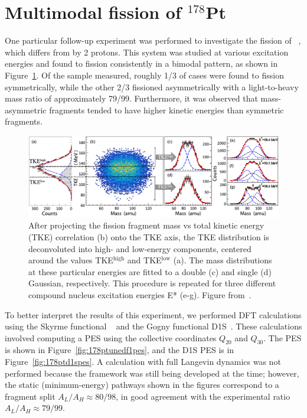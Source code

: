 \section{Multimodal fission of $^{178}$Pt}\label{sect:178Ptfrags}

One particular follow-up experiment was performed to investigate the fission of {\Pt}~\cite{Tsekhanovich2019}, which differs from {\Hg} by 2 protons. This system was studied at various excitation energies and found to fission consistently in a bimodal pattern, as shown in Figure~\ref{fig:178ptexptdata}. Of the sample measured, roughly 1/3 of cases were found to fission symmetrically, while the other 2/3 fissioned asymmetrically with a light-to-heavy mass ratio of approximately 79/99. Furthermore, it was observed that mass-asymmetric fragments tended to have higher kinetic energies than symmetric fragments.

\begin{figure}
	\centering
	\includegraphics[width=0.95\linewidth]{TeX_files/178Pt_expt_data}
	\caption[After projecting the fission fragment mass vs total kinetic energy (TKE) correlation (b) onto the TKE axis, the TKE distribution is deconvoluted into high- and low-energy components, centered around the values TKE$^\mathrm{high}$ and TKE$^\mathrm{low}$ (a). The mass distributions at these particular energies are fitted to a double (c) and single (d) Gaussian, respectively. This procedure is repeated for three different compound nucleus excitation energies E* (e-g).]{After projecting the fission fragment mass vs total kinetic energy (TKE) correlation (b) onto the TKE axis, the TKE distribution is deconvoluted into high- and low-energy components, centered around the values TKE$^\mathrm{high}$ and TKE$^\mathrm{low}$ (a). The mass distributions at these particular energies are fitted to a double (c) and single (d) Gaussian, respectively. This procedure is repeated for three different compound nucleus excitation energies E* (e-g). Figure from~\cite{Tsekhanovich2019}.}
	\label{fig:178ptexptdata}
\end{figure}

To better interpret the results of this experiment, we performed DFT calculations using the Skyrme functional {\hfb}~\cite{Schunck2015} and the Gogny functional D1S~\cite{Berger1989}. These calculations involved computing a PES using the collective coordinates $Q_{20}$ and $Q_{30}$. The {\hfb} PES is shown in Figure~\ref{fig:178ptunedf1pes}, and the D1S PES is in Figure~\ref{fig:178ptd1spes}. A calculation with full Langevin dynamics was not performed because the framework was still being developed at the time; however, the static (minimum-energy) pathways shown in the figures correspond to a fragment split $A_L/A_H \approx 80/98$, in good agreement with the experimental ratio $A_L/A_H \approx 79/99$.


